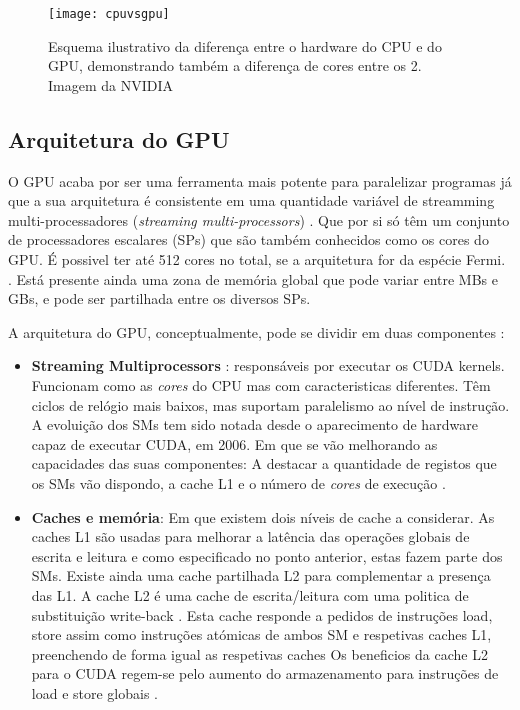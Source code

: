   \begin{figure}[ht]
  \centering
    {\texttt{[image: cpuvsgpu]}}
  \caption{Esquema ilustrativo da diferença entre o hardware do CPU e do GPU, demonstrando também a diferença de cores entre os 2. Imagem da NVIDIA}
  \label{fig:fig2subfig}
\end{figure}

\subsection{Arquitetura do GPU}

 O GPU acaba por ser uma ferramenta mais potente para paralelizar programas já que a sua arquitetura é consistente em uma quantidade variável de streamming multi-processadores (\textit{streaming multi-processors}) \cite{ritchiew}. Que por si só têm um conjunto de processadores escalares (SPs) que são também conhecidos como os cores do GPU. É possivel ter até 512 cores no total, se a arquitetura for da espécie Fermi. \cite{wittenbrink2011fermi}. Está presente ainda uma zona de memória global que pode variar entre MBs e GBs, e pode ser partilhada entre os diversos SPs.

 A arquitetura do GPU, conceptualmente, pode se dividir em duas componentes : 
 
\begin{itemize}
\item \textbf{Streaming Multiprocessors} : responsáveis por executar os CUDA kernels. Funcionam como as \textit{cores} do CPU mas com caracteristicas diferentes. Têm ciclos de relógio mais baixos, mas suportam paralelismo ao nível de instrução. A evoluição dos SMs tem sido notada desde o aparecimento de hardware capaz de executar CUDA, em 2006. Em que se vão melhorando as capacidades das suas componentes: A destacar a quantidade de registos que os SMs vão dispondo, a cache L1 e o número de \textit{cores} de execução \cite{wilt_2013}.  
\item \textbf{Caches e memória}: Em que existem dois níveis de cache a considerar. As caches L1 são usadas para melhorar a latência das operações globais de escrita e leitura e como especificado no ponto anterior, estas fazem parte dos SMs. Existe ainda uma cache partilhada L2 para complementar a presença das L1. A cache L2 é uma cache de escrita/leitura com uma politica de substituição write-back . Esta cache responde a pedidos de instruções load, store assim como instruções atómicas de ambos SM e respetivas caches L1, preenchendo  de forma igual as respetivas caches \cite{nickolls2010gpu}  Os beneficios da cache L2 para o CUDA regem-se pelo aumento do armazenamento para instruções de load e store globais \cite{wittenbrink2011fermi}.  %
\end{itemize}


